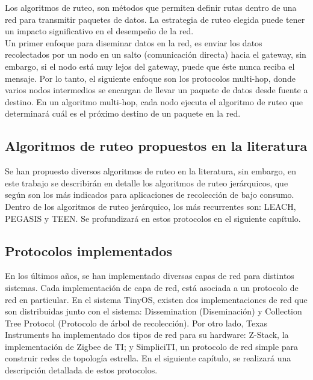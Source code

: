 Los algoritmos de ruteo, son métodos que permiten definir rutas dentro de una red para transmitir paquetes de datos. La estrategia de ruteo elegida puede tener un impacto significativo en el desempeño de la red\cite{WSNSurvey}.\\


Un primer enfoque para diseminar datos en la red, es enviar los datos recolectados por un nodo en un salto (comunicación directa) hacia el gateway, sin embargo, si el nodo está muy lejos del gateway, puede que éste nunca reciba el mensaje. Por lo tanto, el siguiente enfoque son los protocolos multi-hop, donde varios nodos intermedios se encargan de llevar un paquete de datos desde fuente a destino. En un algoritmo multi-hop, cada nodo ejecuta el algoritmo de ruteo que determinará cuál es el próximo destino de un paquete en la red.

\subsection{Algoritmos de ruteo propuestos en la literatura}
Se han propuesto diversos algoritmos de ruteo en la literatura, sin embargo, en este trabajo se describirán en detalle los algoritmos de ruteo jerárquicos, que según \cite{WSNSurvey} son los más indicados para aplicaciones de recolección de bajo consumo. Dentro de los algoritmos de ruteo jerárquico, los más recurrentes son: LEACH, PEGASIS y TEEN. Se profundizará en estos protocolos en el siguiente capítulo.


\subsection{Protocolos implementados}
En los últimos años, se han implementado diversas capas de red para distintos sistemas.  Cada implementación de capa de red, está asociada a un protocolo de red en particular. En el sistema TinyOS, existen dos implementaciones de red que son distribuidas junto con el sistema: Dissemination (Diseminación) y Collection Tree Protocol (Protocolo de árbol de recolección). Por otro lado, Texas Instruments ha implementado dos tipos de red para su hardware: Z-Stack, la implementación de Zigbee de TI; y SimpliciTI, un protocolo de red simple para construir redes de topología estrella. En el siguiente capítulo, se realizará una descripción detallada de estos protocolos.

